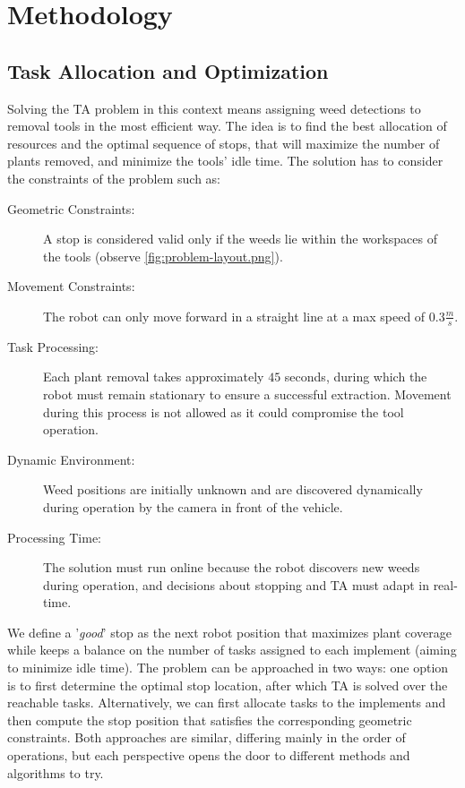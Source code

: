 \chapter{Methodology}\label{ch:methodology}
\section{Task Allocation and Optimization}\label{sec:TA}
Solving the \ac{TA} problem in this context means assigning weed detections to removal tools in the most efficient way. The idea is to find the best allocation of resources and the optimal sequence of stops, that will maximize the number of plants removed, and minimize the tools' idle time. The solution has to consider the constraints of the problem such as:

\begin{description}
    \item[Geometric Constraints:] A stop is considered valid only if the weeds lie within the workspaces of the tools (observe \autoref{fig:problem-layout.png}).
    \item[Movement Constraints:] The robot can only move forward in a straight line at a max speed of $0.3\frac{m}{s}$. %
    \item[Task Processing:] Each plant removal takes approximately $45$ seconds, during which the robot must remain stationary to ensure a successful extraction. Movement during this process is not allowed as it could compromise the tool operation.
    \item[Dynamic Environment:] Weed positions are initially unknown and are discovered dynamically during operation by the camera in front of the vehicle.
    \item[Processing Time:] The solution must run online because the robot discovers new weeds during operation, and decisions about stopping and \ac{TA} must adapt in real-time.
\end{description}

We define a '\textit{good}' stop as the next robot position that maximizes plant coverage while keeps a balance on the number of tasks assigned to each implement (aiming to minimize idle time). The problem can be approached in two ways: one option is to first determine the optimal stop location, after which \ac{TA} is solved over the reachable tasks. Alternatively, we can first allocate tasks to the implements and then compute the stop position that satisfies the corresponding geometric constraints. Both approaches are similar, differing mainly in the order of operations, but each perspective opens the door to different methods and algorithms to try.

